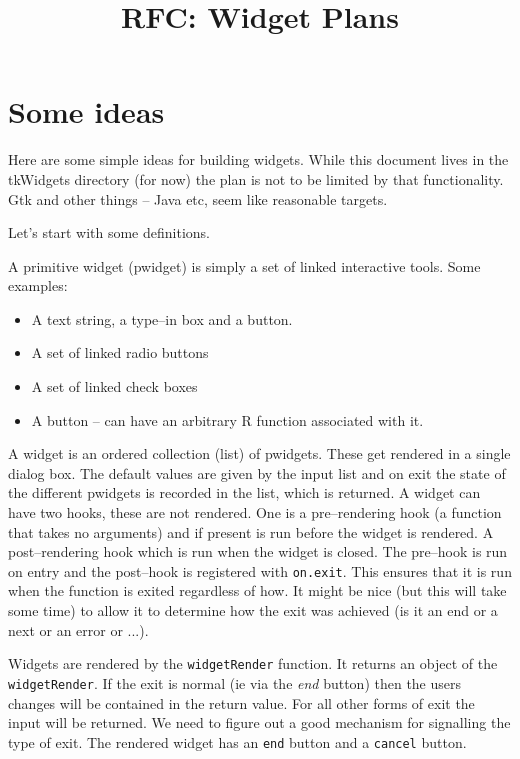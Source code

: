 \documentclass{article}
\begin{document}
\title{RFC: Widget Plans}
\maketitle


\section*{Some ideas}

Here are some simple ideas for building widgets. While this document
lives in the tkWidgets directory (for now) the plan is not to be
limited by that functionality. Gtk and other things -- Java etc,
seem like reasonable targets.

Let's start with some definitions.

A primitive widget (pwidget) is simply a set of linked interactive
tools.
Some examples:
\begin{itemize}
\item A text string, a type--in box and a button.
\item A set of linked radio buttons
\item A set of linked check boxes
\item A button -- can have an arbitrary R function associated with it.
\end{itemize}

A widget is an ordered collection (list) of pwidgets.
These get rendered in a single dialog box.
The default values are given by the input list and on exit the state
of the different pwidgets is recorded in the list, which is returned.
A widget can have two hooks, these are not rendered. One is a
pre--rendering hook (a function that takes no arguments) and if
present is run before the widget is rendered.
A post--rendering hook which is run when the widget is closed.
The pre--hook is run on entry and the post--hook is registered with 
\verb+on.exit+. This ensures that it is run when the function is
exited regardless of how. It might be nice (but this will take some
time) to allow it to determine how the exit was achieved (is it an end
or a next or an error or ...).

Widgets are rendered by the \verb+widgetRender+ function.
It returns an object of the \verb+widgetRender+. If the exit is normal
(ie via the {\em end} button) then the users changes will be contained
in the return value. For all other forms of exit the input will be
returned. We need to figure out a good mechanism for signalling the
type of exit.
The rendered widget has an \verb+end+ button and a \verb+cancel+
button.
\end{document}
